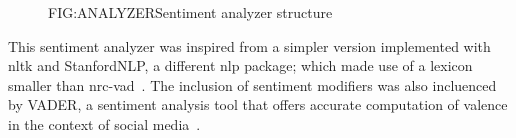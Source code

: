 \begin{figure}[Sentiment analyzer]{FIG:ANALYZER}{Sentiment analyzer structure}\hspace*{1.4em}
\end{figure}

This sentiment analyzer was inspired from a simpler version implemented with \acs{nltk} and StanfordNLP, a different \acl{nlp} package; which made use of a lexicon smaller than \acs{nrc}-\acs{vad}~\cite{SENTIMENTANALYSIS}. The inclusion of sentiment modifiers was also incluenced by VADER, a sentiment analysis tool that offers accurate computation of valence in the context of social media~\cite{VADER}.